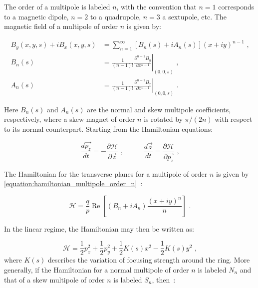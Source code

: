 The order of a multipole is labeled \(n\), with the convention that \(n = 1\) corresponds to a magnetic dipole, \(n = 2\) to a quadrupole, \(n = 3\) a sextupole, etc.
The magnetic field of a multipole of order \(n\) is given by:

\begin{equation}
    \begin{aligned}
    B_y(x, y, s) + i B_x(x, y, s) & = \sum_{n=1}^{\infty} \left[ B_n(s) + i A_n(s) \right] (x + i y)^{n-1} \text{ ,} \\
    B_n(s)                        & = \left. \frac{1}{(n - 1) !} \frac{\partial^{n - 1} B_y}{\partial x^{n - 1}} \right|_{(0,0,s)} \text{ ,} \\
    A_n(s)                        & = \left. \frac{1}{(n - 1) !} \frac{\partial^{n - 1} B_x}{\partial x^{n - 1}} \right|_{(0,0,s)} \text{ .} 
    \end{aligned}
    \label{equation:multipole_expansion}
\end{equation}

Here \(B_n(s)\) and \(A_n(s)\) are the normal and skew multipole coefficients, respectively, where a skew magnet of order \(n\) is rotated by \(\pi / (2 n)\) with respect to its normal counterpart.
Starting from the Hamiltonian equations:

\begin{equation}
    \dfrac{d \vec{p_z}}{d t} = - \frac{\partial \mathcal{H}}{\partial \vec{z}} \text{ ,} \quad \quad \quad \dfrac{d \vec{z}}{d t} = \frac{\partial \mathcal{H}}{\partial \vec{p_z}} \text{ ,}
    \label{equation:hamiltonian_equations}
\end{equation}

The Hamiltonian for the transverse planes for a multipole of order \(n\) is given by \cref{equation:hamiltonian_multipole_order_n}~\cite{PHD:Tomas, PHD:Franchi}:

\begin{equation}
    \mathcal{H} = \frac{q}{p} \operatorname{Re} \left[ \left( B_n +i A_n \right) \frac{(x + i y)^n}{n} \right] \text{ .}
    \label{equation:hamiltonian_multipole_order_n}
\end{equation}

In the linear regime, the Hamiltonian may then be written as:

\begin{equation}
    \mathcal{H} = \frac{1}{2} p_x^2 + \frac{1}{2} p_y^2 + \frac{1}{2} K(s) x^2 - \frac{1}{2} K(s) y^2 \text{ ,}
    \label{equation:hamiltonian_linear_lattice}
\end{equation}
where \(K(s)\) describes the variation of focusing strength around the ring.
More generally, if the Hamiltonian for a normal multipole of order \(n\) is labeled \(N_n\) and that of a skew multipole of order \(n\) is labeled \(S_n\), then~\cite{PHD:Maclean, PHD:Persson}:

